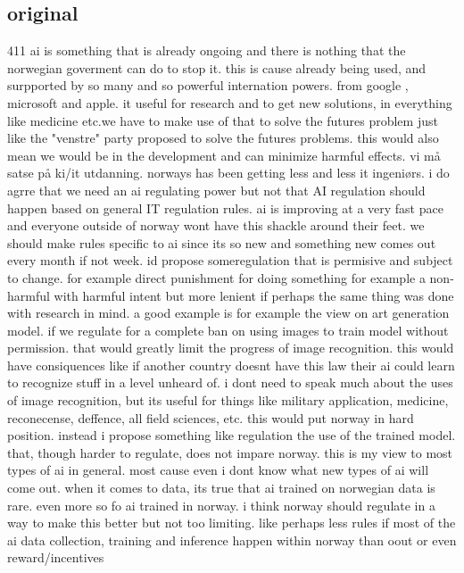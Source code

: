 \documentclass[12pt]{article}
\begin{document}
\subsection{original} 411
ai is something that is already ongoing and there is nothing that the norwegian goverment can do to stop it. this is cause already being used, and surpported by so many and so powerful internation powers. 
from google , microsoft and apple. it useful for research and to get new solutions, 
in everything like medicine etc.we have to make use of that to solve the futures problem just like the "venstre" party 
proposed to solve the futures problems. this would also mean we would be in the development and can minimize harmful effects. 
vi må satse på ki/it utdanning. norways has been getting less and less it ingeniørs. i do agrre that we need an ai regulating power but 
not that AI regulation should happen based on general IT regulation rules. ai is improving at a very fast pace and everyone outside of norway 
wont have this shackle around their feet. we should make rules specific to ai since its so new and something new comes out every month if 
not week. id propose someregulation that is permisive and subject to change. for example direct punishment for doing something for example a 
non-harmful with harmful intent but more lenient if perhaps the same thing was done with research in mind. a good example is for example the 
view on art generation model. if we regulate for a complete ban on using images to train model without permission. that would greatly limit the 
progress of image recognition. this would have consiquences like if another country doesnt have this law their ai could learn to recognize stuff 
in a level unheard of. i dont need to speak much about the uses of image recognition, but its useful for things like military application, medicine, reconecense, deffence, all field sciences, 
etc. this would put norway in hard position. instead i propose something like regulation the use of the trained model. 
that, though harder to regulate, does not impare norway. this is my view to most types of ai in general. most cause even i 
dont know what new types of ai will come out. when it comes to data, its true that ai trained on norwegian data is rare. 
even more so fo ai trained in norway. i think norway should regulate in a way to make this better but not too limiting. 
like perhaps less rules if most of the ai data collection, training and inference happen within norway than oout or even reward/incentives
\end{document}
